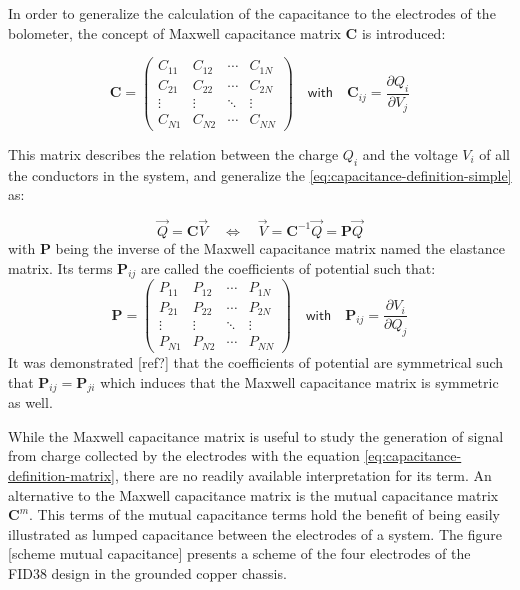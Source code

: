 In order to generalize the calculation of the capacitance to the electrodes of the bolometer, the concept of Maxwell capacitance matrix $\bm{C}$ is introduced:

\begin{equation} 
\label{eq:maxwell-capacitance-matrix}
\bm{C} = 
\begin{pmatrix}
C_{11} & C_{12} & \cdots & C_{1N} \\ 
C_{21} & C_{22} & \cdots & C_{2N} \\ 
\vdots & \vdots & \ddots & \vdots \\ 
C_{N1} & C_{N2} & \cdots & C_{NN}
\end{pmatrix}
\quad \textsf{with} \quad
\bm{C}_{ij} = \frac{\partial Q_i}{\partial V_j}
\end{equation}

This matrix describes the relation between the charge $Q_i$ and the voltage $V_i$ of all the conductors in the system, and generalize the \ref{eq:capacitance-definition-simple} as:

\begin{equation} 
\label{eq:capacitance-definition-matrix}
\vec{Q} =
\bm{C} \vec{V}
\quad \Leftrightarrow \quad
\vec{V} =
\bm{C}^{-1} \vec{Q} = \bm{P} \vec{Q}
\end{equation}
with $\bm{P}$ being the inverse of the Maxwell capacitance matrix named the elastance matrix. Its terms $\bm{P}_{ij}$ are called the coefficients of potential such that:
\begin{equation}
\label{eq:elastance-matrix}
\bm{P} =
\begin{pmatrix}
P_{11} & P_{12} & \cdots & P_{1N} \\ 
P_{21} & P_{22} & \cdots & P_{2N} \\ 
\vdots & \vdots & \ddots & \vdots \\ 
P_{N1} & P_{N2} & \cdots & P_{NN}
\end{pmatrix}
\quad \textsf{with} \quad
\bm{P}_{ij} = \frac{\partial V_i}{\partial Q_j}
\end{equation}
It was demonstrated [ref?] that the coefficients of potential are symmetrical such that  $\bm{P}_{ij} = \bm{P}_{ji}$ which induces that the Maxwell capacitance matrix is symmetric as well.

While the Maxwell capacitance matrix is useful to study the generation of signal from charge collected by the electrodes with the equation \ref{eq:capacitance-definition-matrix}, there are no readily available interpretation for its term. An alternative to the Maxwell capacitance matrix is the mutual capacitance matrix $\bm{C}^m$. This terms of the mutual capacitance terms hold the benefit of being easily illustrated as lumped capacitance between the electrodes of a system. The figure [scheme mutual capacitance] presents a scheme of the four electrodes of the FID38 design in the grounded copper chassis.

